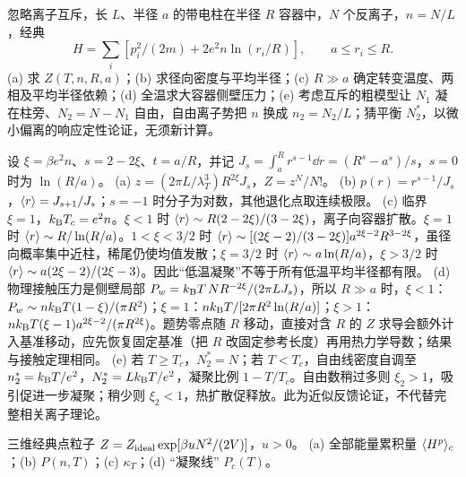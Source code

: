 \begin{center}\end{center}
\begin{exercise}
忽略离子互斥，长 $L$、半径 $a$ 的带电柱在半径 $R$ 容器中，$N$ 个反离子，$n=N/L$，经典
\[H=\sum_i[p_i^2/(2m)+2e^2n\ln(r_i/R)],\qquad a\le r_i\le R.\]
(a) 求 $Z(T,n,R,a)$；(b) 求径向密度与平均半径；(c) $R\gg a$ 确定转变温度、两相及平均半径依赖；(d) 全温求大容器侧壁压力；(e) 考虑互斥的粗模型让 $N_1$ 凝在柱旁、$N_2=N-N_1$ 自由，自由离子势把 $n$ 换成 $n_2=N_2/L$；猜平衡 $N_2^*$，以微小偏离的响应定性论证，无须新计算。
\end{exercise}
\begin{solution}
设 $\xi=\beta e^2n$、$s=2-2\xi$、$t=a/R$，并记 $J_s=\int_a^Rr^{s-1}\dd r=(R^s-a^s)/s$，$s=0$ 时为 $\ln(R/a)$。
(a) $z=(2\pi L/\lambda_T^3)R^{2\xi}J_s$，$Z=z^N/N!$。
(b) $p(r)=r^{s-1}/J_s$，$\langle r\rangle=J_{s+1}/J_s$；$s=-1$ 时分子为对数，其他退化点取连续极限。
(c) 临界 $\xi=1$，$k_{\mathrm B} T_c=e^2n$。$\xi<1$ 时 $\langle r\rangle\sim R(2-2\xi)/(3-2\xi)$，离子向容器扩散。$\xi=1$ 时 $\langle r\rangle\sim R/\ln(R/a)$。$1<\xi<3/2$ 时 $\langle r\rangle\sim[(2\xi-2)/(3-2\xi)]a^{2\xi-2}R^{3-2\xi}$，虽径向概率集中近柱，稀尾仍使均值发散；$\xi=3/2$ 时 $\langle r\rangle\sim a\ln(R/a)$，$\xi>3/2$ 时 $\langle r\rangle\sim a(2\xi-2)/(2\xi-3)$。因此“低温凝聚”不等于所有低温平均半径都有限。
(d) 物理接触压力是侧壁局部 $P_w=k_{\mathrm B} T\,N R^{-2\xi}/(2\pi L J_s)$，所以 $R\gg a$ 时，$\xi<1$：$P_w\sim nk_{\mathrm B} T(1-\xi)/(\pi R^2)$；$\xi=1$：$nk_{\mathrm B} T/[2\pi R^2\ln(R/a)]$；$\xi>1$：$nk_{\mathrm B} T(\xi-1)a^{2\xi-2}/(\pi R^{2\xi})$。题势零点随 $R$ 移动，直接对含 $R$ 的 $Z$ 求导会额外计入基准移动，应先恢复固定基准（把 $R$ 改固定参考长度）再用热力学导数；结果与接触定理相同。
(e) 若 $T\ge T_c$，$N_2^*=N$；若 $T<T_c$，自由线密度自调至 $n_2^*=k_{\mathrm B} T/e^2$，$N_2^*=Lk_{\mathrm B} T/e^2$，凝聚比例 $1-T/T_c$。自由数稍过多则 $\xi_2>1$，吸引促进一步凝聚；稍少则 $\xi_2<1$，热扩散促释放。此为近似反馈论证，不代替完整相关离子理论。
\end{solution}
\begin{exercise}
三维经典点粒子 $Z=Z_{\rm ideal}\exp[\beta uN^2/(2V)]$，$u>0$。
(a) 全部能量累积量 $\langle H^p\rangle_c$；(b) $P(n,T)$；(c) $\kappa_T$；(d) “凝聚线” $P_c(T)$。
\end{exercise}
